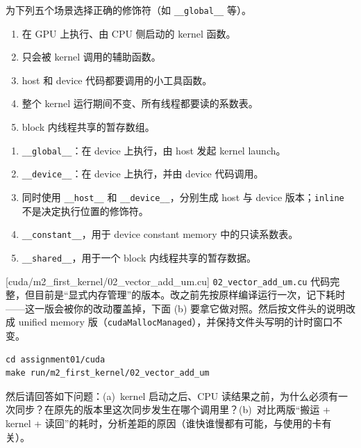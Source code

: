 \documentclass[11pt,a4paper,fontset=none]{ctexart}
\begin{document}
为下列五个场景选择正确的修饰符（如 \texttt{\_\_global\_\_} 等）。
\begin{enumerate}[label=(\alph*)]
  \item 在 GPU 上执行、由 CPU 侧启动的 kernel 函数。
  \item 只会被 kernel 调用的辅助函数。
  \item host 和 device 代码都要调用的小工具函数。
  \item 整个 kernel 运行期间不变、所有线程都要读的系数表。
  \item block 内线程共享的暂存数组。
\end{enumerate}

\begin{tcolorbox}[title={2.2 作答（讨论后订正）}]
\begin{enumerate}[label=(\alph*)]
  \item \texttt{\_\_global\_\_}：在 device 上执行，由 host 发起 kernel launch。
  \item \texttt{\_\_device\_\_}：在 device 上执行，并由 device 代码调用。
  \item 同时使用 \texttt{\_\_host\_\_} 和 \texttt{\_\_device\_\_}，分别生成 host 与 device 版本；\texttt{inline} 不是决定执行位置的修饰符。
  \item \texttt{\_\_constant\_\_}，用于 device constant memory 中的只读系数表。
  \item \texttt{\_\_shared\_\_}，用于一个 block 内线程共享的暂存数据。
\end{enumerate}
\end{tcolorbox}

[cuda/m2\_first\_kernel/02\_vector\_add\_um.cu]
\texttt{02\_vector\_add\_um.cu} 代码完整，但目前是“显式内存管理”的版本。改之前先按原样编译运行一次，记下耗时——这一版会被你的改动覆盖掉，下面 (b) 要拿它做对照。然后按文件头的说明改成 unified memory 版（\texttt{cudaMallocManaged}），并保持文件头写明的计时窗口不变。

\begin{lstlisting}
cd assignment01/cuda
make run/m2_first_kernel/02_vector_add_um
\end{lstlisting}

然后请回答如下问题：(a)~kernel 启动之后、CPU 读结果之前，为什么必须有一次同步？在原先的版本里这次同步发生在哪个调用里？(b)~对比两版“搬运 + kernel + 读回”的耗时，分析差距的原因（谁快谁慢都有可能，与使用的卡有关）。
\end{document}
